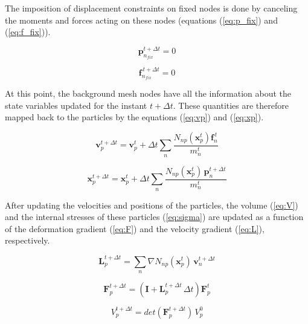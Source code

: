 \documentclass[preprint,12pt]{elsarticle}
\begin{document}
	The imposition of displacement constraints on fixed nodes is done by canceling the moments and forces acting on these nodes (equations (\ref{eq:p_fix}) and (\ref{eq:f_fix})).
	
	\begin{equation}
		\boldsymbol{p}_{n_{fix}}^{t+\Delta t}=0
		\label{eq:p_fix}
	\end{equation}
	
	\begin{equation}
		\boldsymbol{f}_{n_{fix}}^{\,t+\Delta t}=0
	    \label{eq:f_fix}
	\end{equation}
	
	At this point, the background mesh nodes have all the information about the state variables updated for the instant $t+\Delta t$. These quantities are therefore mapped back to the particles by the equations (\ref{eq:vp}) and (\ref{eq:xp}). 
	
	\begin{equation}
		\boldsymbol{v}_{p}^{t+\Delta t}=\boldsymbol{v}_{p}^{t} +\Delta t \sum_{n}\frac{N_{np}(\boldsymbol{x}_{p}^{t})\boldsymbol{f}_{n}^{\,t}}{m_{n}^{t}}
		\label{eq:vp}
	\end{equation}

	\begin{equation}
		\boldsymbol{x}_{p}^{t+\Delta t}=\boldsymbol{x}_{p}^{t}+\Delta t \sum_{n} \frac{N_{np}(\boldsymbol{x}_{p}^{t})\,\boldsymbol{p}_{n}^{t+\Delta t}}{m_{n}^{t}}
	    \label{eq:xp}
	\end{equation}

    After updating the velocities and positions of the particles, the volume (\ref{eq:V}) and the internal stresses of these particles (\ref{eq:sigma}) are updated as a function of the deformation gradient (\ref{eq:F}) and the velocity gradient (\ref{eq:L}), respectively.

	\begin{equation}
		\textbf{L}_{p}^{t+\Delta t}=\sum_{n} \nabla N_{np}(\boldsymbol{x}_{p}^{t})\,\boldsymbol{v}_{n}^{t+\Delta t}
		\label{eq:L}
	\end{equation}

	\begin{equation}
		\textbf{F}_{p}^{t+\Delta t}=(\textbf{I}+\textbf{L}_{p}^{t+\Delta t}\,\Delta t)\textbf{F}_{p}^{t}
        \label{eq:F}
	\end{equation}
	
	\begin{equation}
	    V_p^{t+\Delta t}=det(\textbf{F}_p^{t+\Delta t})\,V_p^0
	    \label{eq:V}
	\end{equation}
	
\end{document}
